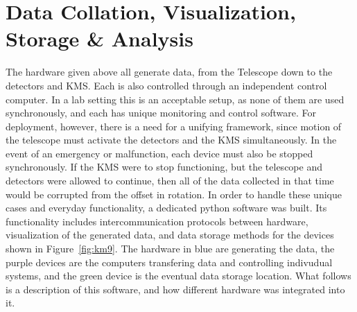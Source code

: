 \documentclass[manuscript]{aastex}
\begin{document}
\newpage
\section{\textbf{Data Collation, Visualization, Storage \& Analysis}}
The hardware given above all generate data, from the Telescope down to the detectors and KMS. Each is also controlled through an independent control computer. In a lab setting this is an acceptable setup, as none of them are used synchronously, and each has unique monitoring and control software. For deployment, however, there is a need for a unifying framework, since motion of the telescope must activate the detectors and the KMS simultaneously. In the event of an emergency or malfunction, each device must also be stopped synchronously. If the KMS were to stop functioning, but the telescope and detectors were allowed to continue, then all of the data collected in that time would be corrupted from the offset in rotation. In order to handle these unique cases and everyday functionality, a dedicated python software was built. Its functionality includes intercommunication protocols between hardware, visualization of the generated data, and data storage methods for the devices shown in Figure~\ref{fig:km9}. The hardware in blue are generating the data, the purple devices are the computers transfering data and controlling indivudual systems, and the green device is the eventual data storage location. What follows is a description of this software, and how different hardware was integrated into it.
\end{document}

